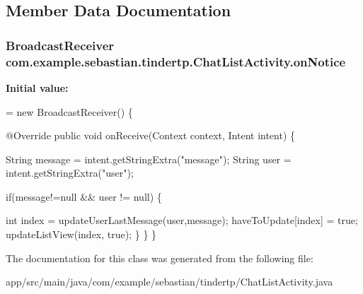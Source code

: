 \subsection{Member Data Documentation}
\subsubsection[{\texorpdfstring{on\+Notice}{onNotice}}]{\setlength{\rightskip}{0pt plus 5cm}Broadcast\+Receiver com.\+example.\+sebastian.\+tindertp.\+Chat\+List\+Activity.\+on\+Notice\hspace{0.3cm}{\ttfamily [private]}}\hypertarget{classcom_1_1example_1_1sebastian_1_1tindertp_1_1ChatListActivity_a3dfd0b937f133bc3ec2efe6861cd20d7}{}\label{classcom_1_1example_1_1sebastian_1_1tindertp_1_1ChatListActivity_a3dfd0b937f133bc3ec2efe6861cd20d7}
{\bfseries Initial value\+:}
\begin{DoxyCode}
= \textcolor{keyword}{new} BroadcastReceiver() \{

        @Override
        \textcolor{keyword}{public} \textcolor{keywordtype}{void} onReceive(Context context, Intent intent) \{

            String message = intent.getStringExtra(\textcolor{stringliteral}{"message"});
            String user = intent.getStringExtra(\textcolor{stringliteral}{"user"});

            \textcolor{keywordflow}{if}(message!=null && user != null) \{

                \textcolor{keywordtype}{int} index = updateUserLastMessage(user,message);
                haveToUpdate[index] = \textcolor{keyword}{true};
                updateListView(index, \textcolor{keyword}{true});
            \}
        \}
    \}
\end{DoxyCode}


The documentation for this class was generated from the following file\+:\begin{DoxyCompactItemize}
\item 
app/src/main/java/com/example/sebastian/tindertp/Chat\+List\+Activity.\+java\end{DoxyCompactItemize}
